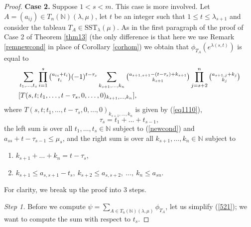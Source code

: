 \documentclass[ALCO,Unicode]{cedram}
\newcommand{\la}{\lambda}
\numberwithin{equation}{section}
\begin{document}
\begin{proof}
\textbf{Case 2.} Suppose $1<s<m$. This case is more involved. Let $A=(a_{ij}) \in T_{n}(\mathbb{N})(\la, \mu)$, let $t$ be an integer such that $1 \le t \le \la_{s+1}$ and consider the tableau $T_A \in \mathrm{SST}_{\la}(\mu)$. As in the first paragraph of the proof of Case 2 of Theorem \ref{thm13} (the only difference is that here we use Remark \ref{remnewcond} in place of Corollary \ref{corhom}) we obtain that $\phi_{T_{A}}(e^{\la(s,t)})$ is equal to 
\begin{align}\label{521}
	&\sum_{t_1,\dots,t_{s}}\prod_{i=1}^{s}\tbinom{a_{is}+t_i}{t_i}(-1)^{t-\tau_s} \sum_{k_{s+1},\dots,k_n}\tbinom{a_{s+1,s+1}-(t-\tau_s)+k_{s+1}}{k_{s+1}}\prod_{j=s+2}^{n}\tbinom{a_{s+1,j}+k_{j}}{k_{j}}\\\nonumber&[T(s,t;t_1,\dots,t-\tau_s,0,\dots,0)_{k_{s+1},\dots,k_n}],\end{align} 
where  $T(s,t;t_1,\dots,t-\tau_s,0,\dots,0)_{k_{s+1},\dots,k_n}$ is given by (\ref{eq1110}), \[\tau_s=t_1 + \dots + t_{s-1},\] the left sum is over all  $t_1,\dots,t_{s} \in \mathbb{N}$ subject to (\ref{newcond}) and $a_{ss}+t-\tau_{s-1} \le \mu_s$,
and the right sum is over all  $k_{s+1},\dots,k_{n} \in \mathbb{N}$ subject to
\begin{enumerate} \item[(Sa)] $k_{s+1}+\dots+k_n=t-\tau_s$, \item[(Sb)] $k_{s+1} \le a_{s,s+1}-t_s, \ k_{s+2} \le a_{s,s+2}, \ \dots, \ k_n \le a_{sn}.$\end{enumerate}

For clarity, we break up the proof into 3 steps.

\textit{Step 1.} Before we compute $\psi = \sum_{A \in T_{n}(\mathbb{N})(\la, \mu)}\phi_{T_A}$, let us simplify (\ref{521}); we want to compute the sum with respect to $t_s$.


\end{proof}
\end{document}
